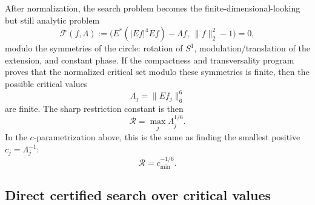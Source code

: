 \documentclass[12pt]{article}
\begin{document}
After normalization, the search problem becomes the finite-dimensional-looking
but still analytic problem
\[
  \mathcal F(f,\Lambda)
  :=
  \bigl(E^*(|Ef|^4Ef)-\Lambda f,\ \|f\|_2^2-1\bigr)=0,
\]
modulo the symmetries of the circle: rotation of $S^1$, modulation/translation
of the extension, and constant phase. If the compactness and transversality
program proves that the normalized critical set modulo these symmetries is
finite, then the possible critical values
\[
  \Lambda_j=\|Ef_j\|_6^6
\]
are finite. The sharp restriction constant is then
\[
  \mathcal R=\max_j \Lambda_j^{1/6}.
\]
In the $c$-parametrization above, this is the same as finding the smallest
positive $c_j=\Lambda_j^{-1}$:
\[
  \mathcal R=c_{\min}^{-1/6}.
\]

\subsection{Direct certified search over critical values}
\end{document}
